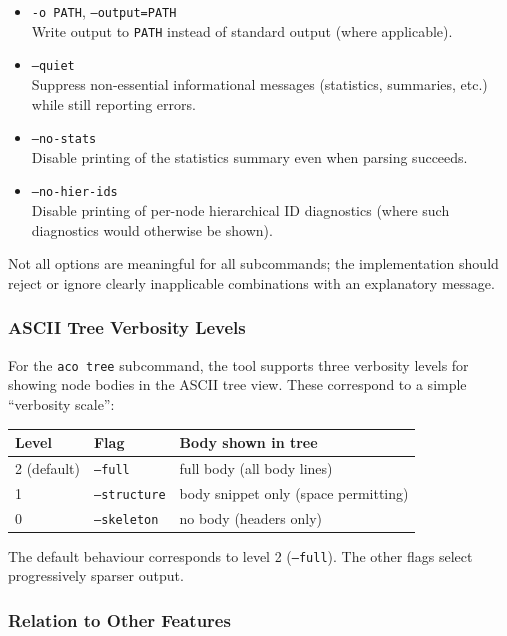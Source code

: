 \documentclass[11pt,twoside,a4paper]{article}
\begin{document}
\begin{itemize}[leftmargin=2em]
  \item \texttt{-o PATH}, \texttt{--output=PATH} \\
        Write output to \texttt{PATH} instead of standard output (where applicable).
  \item \texttt{--quiet} \\
        Suppress non-essential informational messages (statistics, summaries, etc.) while still reporting errors.
  \item \texttt{--no-stats} \\
        Disable printing of the statistics summary even when parsing succeeds.
  \item \texttt{--no-hier-ids} \\
        Disable printing of per-node hierarchical ID diagnostics (where such diagnostics would otherwise be shown).
\end{itemize}

Not all options are meaningful for all subcommands; the implementation should reject or ignore clearly inapplicable combinations with an explanatory message.

\subsubsection*{ASCII Tree Verbosity Levels}

For the \texttt{aco tree} subcommand, the tool supports three verbosity levels for showing node bodies in the ASCII tree view. These correspond to a simple ``verbosity scale'':

\begin{center}
\begin{tabular}{lll}
\hline
\textbf{Level} & \textbf{Flag}        & \textbf{Body shown in tree} \\
\hline
2 (default)    & \texttt{--full}      & full body (all body lines) \\
1              & \texttt{--structure} & body snippet only (space permitting) \\
0              & \texttt{--skeleton}  & no body (headers only) \\
\hline
\end{tabular}
\end{center}

The default behaviour corresponds to level 2 (\texttt{--full}). The other flags select progressively sparser output.

\subsubsection*{Relation to Other Features}
\end{document}
